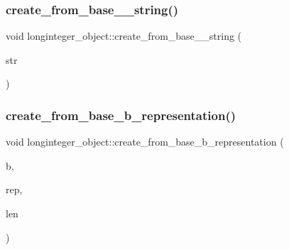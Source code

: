 \mbox{\label{classlonginteger__object_a13c34d3e9ee13ae9a5b6ad1dd38808b5}} 
\subsubsection{\texorpdfstring{create\+\_\+from\+\_\+base\+\_\+\_\+string()}{create\_from\_base\_10\_string()}\hspace{0.1cm}{\footnotesize\ttfamily [2/2]}}
{\footnotesize\ttfamily void longinteger\+\_\+object\+::create\+\_\+from\+\_\+base\+\_\+\_\+string (\begin{DoxyParamCaption}\item[{const \mbox{\hyperlink{galois_8h_ab6cc7b4aeb6ea31aba2b3fbfc83ff5e6}{B\+Y\+TE}} $\ast$}]{str }\end{DoxyParamCaption})}

\mbox{\label{classlonginteger__object_a06bc0298bac1ff9dbe29fb037948d8f2}} 
\subsubsection{\texorpdfstring{create\+\_\+from\+\_\+base\+\_\+b\+\_\+representation()}{create\_from\_base\_b\_representation()}}
{\footnotesize\ttfamily void longinteger\+\_\+object\+::create\+\_\+from\+\_\+base\+\_\+b\+\_\+representation (\begin{DoxyParamCaption}\item[{\mbox{\hyperlink{galois_8h_a09fddde158a3a20bd2dcadb609de11dc}{I\+NT}}}]{b,  }\item[{\mbox{\hyperlink{galois_8h_a09fddde158a3a20bd2dcadb609de11dc}{I\+NT}} $\ast$}]{rep,  }\item[{\mbox{\hyperlink{galois_8h_a09fddde158a3a20bd2dcadb609de11dc}{I\+NT}}}]{len }\end{DoxyParamCaption})}

